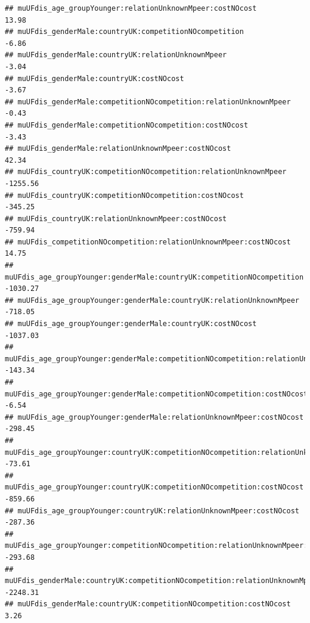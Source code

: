 \documentclass[
]{article}
\begin{document}
\begin{verbatim}
## muUFdis_age_groupYounger:relationUnknownMpeer:costNOcost                                                  13.98
## muUFdis_genderMale:countryUK:competitionNOcompetition                                                     -6.86
## muUFdis_genderMale:countryUK:relationUnknownMpeer                                                         -3.04
## muUFdis_genderMale:countryUK:costNOcost                                                                   -3.67
## muUFdis_genderMale:competitionNOcompetition:relationUnknownMpeer                                          -0.43
## muUFdis_genderMale:competitionNOcompetition:costNOcost                                                    -3.43
## muUFdis_genderMale:relationUnknownMpeer:costNOcost                                                        42.34
## muUFdis_countryUK:competitionNOcompetition:relationUnknownMpeer                                        -1255.56
## muUFdis_countryUK:competitionNOcompetition:costNOcost                                                   -345.25
## muUFdis_countryUK:relationUnknownMpeer:costNOcost                                                       -759.94
## muUFdis_competitionNOcompetition:relationUnknownMpeer:costNOcost                                          14.75
## muUFdis_age_groupYounger:genderMale:countryUK:competitionNOcompetition                                 -1030.27
## muUFdis_age_groupYounger:genderMale:countryUK:relationUnknownMpeer                                      -718.05
## muUFdis_age_groupYounger:genderMale:countryUK:costNOcost                                               -1037.03
## muUFdis_age_groupYounger:genderMale:competitionNOcompetition:relationUnknownMpeer                       -143.34
## muUFdis_age_groupYounger:genderMale:competitionNOcompetition:costNOcost                                   -6.54
## muUFdis_age_groupYounger:genderMale:relationUnknownMpeer:costNOcost                                     -298.45
## muUFdis_age_groupYounger:countryUK:competitionNOcompetition:relationUnknownMpeer                         -73.61
## muUFdis_age_groupYounger:countryUK:competitionNOcompetition:costNOcost                                  -859.66
## muUFdis_age_groupYounger:countryUK:relationUnknownMpeer:costNOcost                                      -287.36
## muUFdis_age_groupYounger:competitionNOcompetition:relationUnknownMpeer:costNOcost                       -293.68
## muUFdis_genderMale:countryUK:competitionNOcompetition:relationUnknownMpeer                             -2248.31
## muUFdis_genderMale:countryUK:competitionNOcompetition:costNOcost                                           3.26

\end{verbatim}
\end{document}
